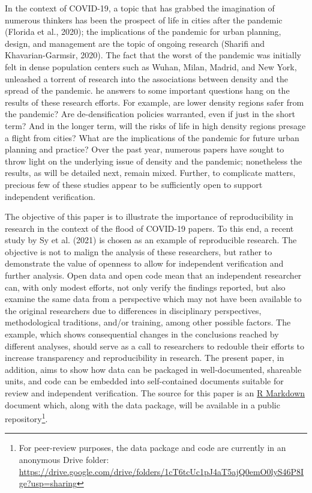\documentclass[]{elsarticle} %
\begin{document}
In the context of COVID-19, a topic that has grabbed the imagination of
numerous thinkers has been the prospect of life in cities after the
pandemic (Florida et al., 2020); the implications of the pandemic for
urban planning, design, and management are the topic of ongoing research
(Sharifi and Khavarian-Garmsir, 2020). The fact that the worst of the
pandemic was initially felt in dense population centers such as Wuhan,
Milan, Madrid, and New York, unleashed a torrent of research into the
associations between density and the spread of the pandemic. he answers
to some important questions hang on the results of these research
efforts. For example, are lower density regions safer from the pandemic?
Are de-densification policies warranted, even if just in the short term?
And in the longer term, will the risks of life in high density regions
presage a flight from cities? What are the implications of the pandemic
for future urban planning and practice? Over the past year, numerous
papers have sought to throw light on the underlying issue of density and
the pandemic; nonetheless the results, as will be detailed next, remain
mixed. Further, to complicate matters, precious few of these studies
appear to be sufficiently open to support independent verification.

The objective of this paper is to illustrate the importance of
reproducibility in research in the context of the flood of COVID-19
papers. To this end, a recent study by Sy et al. (2021) is chosen as an
example of reproducible research. The objective is not to malign the
analysis of these researchers, but rather to demonstrate the value of
openness to allow for independent verification and further analysis.
Open data and open code mean that an independent researcher can, with
only modest efforts, not only verify the findings reported, but also
examine the same data from a perspective which may not have been
available to the original researchers due to differences in disciplinary
perspectives, methodological traditions, and/or training, among other
possible factors. The example, which shows consequential changes in the
conclusions reached by different analyses, should serve as a call to
researchers to redouble their efforts to increase transparency and
reproducibility in research. The present paper, in addition, aims to
show how data can be packaged in well-documented, shareable units, and
code can be embedded into self-contained documents suitable for review
and independent verification. The source for this paper is an
\href{http://rmarkdown.rstudio.com}{R Markdown} document which, along
with the data package, will be available in a public
repository\footnote{For peer-review purposes, the data package and code
  are currently in an anonymous Drive folder:
  \url{https://drive.google.com/drive/folders/1cT6tcUc1pJ4aT5ajQ0emO0lyS46P8Ige?usp=sharing}}.
\end{document}
